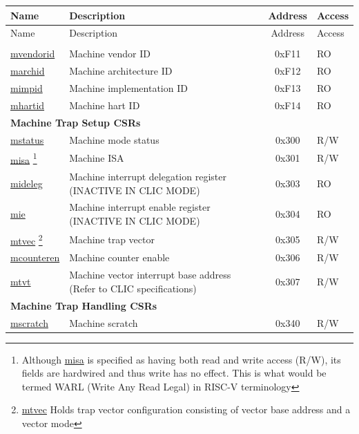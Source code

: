 
\begin{longtable}{ | p{4.0cm} | p{8.4cm} | c | l | }
\hline\rowcolor{lightgray}
Name & Description & Address & Access \\ \hline
\endfirsthead
\hline
\rowcolor{lightgray}
Name & Description & Address & Access \\
\hline
\endhead
\endfoot

\multicolumn{4}{|l|}{\textbf{Machine Information CSRs}} \\\hline
\hyperref[regdesc:MVENDORID]{mvendorid} & Machine vendor ID & 0xF11 & RO \\\hline
\hyperref[regdesc:MARCHID]{marchid} & Machine architecture ID & 0xF12 & RO \\\hline
\hyperref[regdesc:MIMPID]{mimpid} & Machine implementation ID & 0xF13 & RO \\\hline
\hyperref[regdesc:MHARTID]{mhartid} & Machine hart ID & 0xF14 & RO \\\hline
\multicolumn{4}{|l|}{\textbf{Machine Trap Setup CSRs}} \\\hline
\hyperref[regdesc:MSTATUS]{mstatus} & Machine mode status & 0x300 & R/W \\\hline
\hyperref[regdesc:MISA]{misa} \footnote{Although \hyperref[regdesc:MISA]{misa} is specified as having both read and write access (R/W), its fields are hardwired and thus write has no effect. This is what would be termed WARL (Write Any Read Legal) in RISC-V terminology} & Machine ISA & 0x301 & R/W \\\hline
\hyperref[regdesc:MIDELEG_REG]{mideleg} & Machine interrupt delegation register (INACTIVE IN CLIC MODE) & 0x303 & RO \\\hline
\hyperref[regdesc:MIE_REG]{mie} & Machine interrupt enable register (INACTIVE IN CLIC MODE) & 0x304 & RO \\\hline
\hyperref[regdesc:MTVEC]{mtvec} \footnote{\hyperref[regdesc:MTVEC]{mtvec} Holds trap vector configuration consisting of vector base address and a vector mode} & Machine trap vector & 0x305 & R/W \\\hline
\hyperref[regdesc:MCOUNTEREN]{mcounteren} & Machine counter enable & 0x306 & R/W \\\hline
\hyperref[regdesc:MTVT]{mtvt} & Machine vector interrupt base address (Refer to CLIC specifications) & 0x307 & R/W \\\hline
\multicolumn{4}{|l|}{\textbf{Machine Trap Handling CSRs}} \\\hline
\hyperref[regdesc:MSCRATCH]{mscratch} & Machine scratch & 0x340 & R/W \\\hline

\end{longtable}
